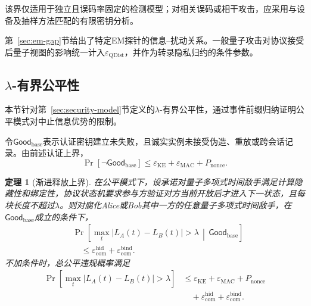 \documentclass[UTF8,10pt,a4paper]{ctexart}
\theoremstyle{aqdplain}
\newtheorem{theorem}{定理}
\newcommand{\Prb}{\Pr}
\begin{document}
该界仅适用于独立且误码率固定的检测模型；对相关误码或相干攻击，应采用与设备及抽样方法匹配的有限密钥分析。

第~\ref{sec:em-gap}节给出了特定EM探针的信息--扰动关系。一般量子攻击对协议接受后量子视图的影响统一计入$\varepsilon_{\mathrm{QDist}}$，并作为转录隐私归约的条件参数。

\subsection{$\lambda$-有界公平性}

本节针对第~\ref{sec:security-model}节定义的$\lambda$-有界公平性，通过事件前缀归纳证明公平模式对中止信息优势的限制。

令$\mathsf{Good}_{\mathrm{base}}$表示认证密钥建立未失败，且诚实实例未接受伪造、重放或跨会话记录。由前述认证上界，
\begin{equation}
\Prb[\neg\mathsf{Good}_{\mathrm{base}}]
\leq \varepsilon_{\mathrm{KE}}
+\varepsilon_{\mathrm{MAC}}+P_{\mathrm{nonce}}.
\label{eq:good-base}
\end{equation}

\begin{theorem}[渐进释放上界]
在公平模式下，设承诺对量子多项式时间敌手满足计算隐藏性和绑定性，协议状态机要求参与方验证对方当前开放后才进入下一状态，且每块长度不超过$\lambda$。则对腐化Alice或Bob其中一方的任意量子多项式时间敌手，在$\mathsf{Good}_{\mathrm{base}}$成立的条件下，
\begin{equation}
\begin{aligned}
&\Prb\!\left[
\max_t |L_A(t)-L_B(t)|>\lambda
\,\middle|\,\mathsf{Good}_{\mathrm{base}}
\right]\\
&\quad\leq
\varepsilon_{\mathrm{com}}^{\mathrm{hid}}
+\varepsilon_{\mathrm{com}}^{\mathrm{bind}}.
\end{aligned}
\label{eq:fairbound}
\end{equation}
不加条件时，总公平违规概率满足
\begin{equation}
\begin{aligned}
\Prb\!\left[\max_t|L_A(t)-L_B(t)|>\lambda\right]
&\leq \varepsilon_{\mathrm{KE}}+\varepsilon_{\mathrm{MAC}}
+P_{\mathrm{nonce}}\\
&\quad+\varepsilon_{\mathrm{com}}^{\mathrm{hid}}
+\varepsilon_{\mathrm{com}}^{\mathrm{bind}}.
\end{aligned}
\label{eq:fairbound-total}
\end{equation}
\end{theorem}
\end{document}
